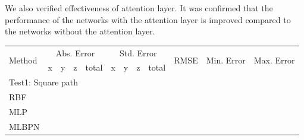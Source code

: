 \documentclass{ieeeaccess}
\begin{document}
We also verified effectiveness of attention layer. It was confirmed that the performance of the networks with the attention layer is improved compared to the networks without the attention layer.
\begin{table}[t]
	\centering
	\begin{tabular}{llllllllllll}
		\toprule
		\multirow{2}{*}{Method} & \multicolumn{4}{c}{Abs. Error}                                                                    & \multicolumn{4}{c}{Std. Error}                                                                    & \multicolumn{1}{c}{\multirow{2}{*}{RMSE}} & \multicolumn{1}{c}{\multirow{2}{*}{Min. Error}} & \multicolumn{1}{c}{\multirow{2}{*}{Max. Error}} \\ \cmidrule{2-5} \cmidrule{6-9}
		& \multicolumn{1}{c}{x} & \multicolumn{1}{c}{y} & \multicolumn{1}{c}{z} & \multicolumn{1}{c}{total} & \multicolumn{1}{c}{x} & \multicolumn{1}{c}{y} & \multicolumn{1}{c}{z} & \multicolumn{1}{c}{total} & \multicolumn{1}{c}{}                      & \multicolumn{1}{c}{}                            & \multicolumn{1}{c}{}                            \\
		\midrule
		\multicolumn{12}{l}{Test1: Square path}                                                                                                                                                                                                                                                                                                                                         \\
		\midrule
		RBF\cite{shareef2008localization}  &                       &                       &                       &                           &                       &                       &                       &                           &                                           &                                                 &                                                 \\
		MLP\cite{rahman2009localization}   &                       &                       &                       &                           &                       &                       &                       &                           &                                           &                                                 &                                                 \\
		MLBPN\cite{singh2013tdoa}          &                       &                       &                       &                           &                       &                       &                       &                           &                                           &                                                 &                                                 \\

\end{tabular}
\end{table}
\end{document}
